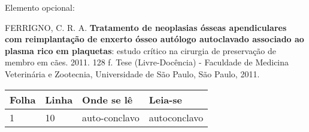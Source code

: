 

Elemento opcional:
	\vspace{\onelineskip}
	
	FERRIGNO, C. R. A. \textbf{Tratamento de neoplasias ósseas apendiculares com
		reimplantação de enxerto ósseo autólogo autoclavado associado ao plasma
		rico em plaquetas}: estudo crítico na cirurgia de preservação de membro em
	cães. 2011. 128 f. Tese (Livre-Docência) - Faculdade de Medicina Veterinária e
	Zootecnia, Universidade de São Paulo, São Paulo, 2011.
	
	\begin{table}[htb]
		\center
		\footnotesize
		\begin{tabular}{|p{1.4cm}|p{1cm}|p{3cm}|p{3cm}|}
			\hline
			\textbf{Folha} & \textbf{Linha}  & \textbf{Onde se lê}  & \textbf{Leia-se}  \\
			\hline
			1 & 10 & auto-conclavo & autoconclavo\\
			\hline
		\end{tabular}
\end{table}


